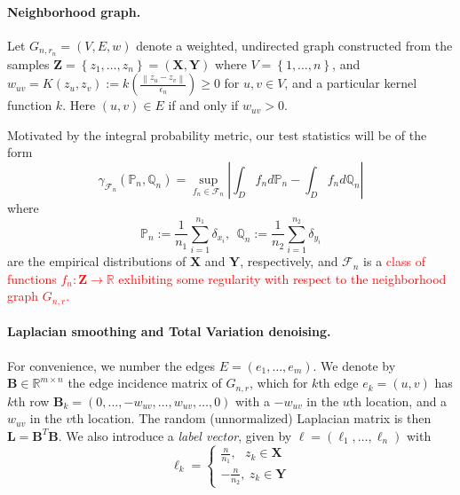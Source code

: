 \documentclass{article}
\newcommand{\Reals}{\mathbb{R}}
\newcommand{\norm}[1]{\left\lVert#1\right\rVert}
\newcommand{\abs}[1]{\left \lvert #1 \right \rvert}
\newcommand{\set}[1]{\left\{#1\right\}}
\newcommand{\F}{\mathcal{F}}
\newcommand{\Xbf}{\mathbf{X}}
\newcommand{\Ybf}{\mathbf{Y}}
\newcommand{\Zbf}{\mathbf{Z}}
\newcommand{\Lbf}{\mathbf{L}}
\newcommand{\Bbf}{\mathbf{B}}
\newcommand{\lbf}{\bm{\ell}}
\newcommand{\Pbb}{\mathbb{P}}
\newcommand{\Qbb}{\mathbb{Q}}
\newcommand{\1}{\mathbf{1}}
\theoremstyle{alden}
\theoremstyle{aldenthm}
\theoremstyle{remark}
\begin{document}
\paragraph{Neighborhood graph.}

Let $G_{n,r_n} = (V,E,w)$ denote a weighted, undirected graph constructed from the samples $\Zbf = \set{z_1, \ldots, z_n} = (\Xbf,\Ybf)$ where $V = \set{1, \ldots, n}$, and $w_{uv} = K(z_u, z_v):= k(\frac{\norm{z_u - z_v}}{\epsilon_n}) \geq 0$ for $u,v \in V$, and a particular kernel function $k$. Here $(u,v) \in E$ if and only if $w_{uv} > 0$.

Motivated by the integral probability metric, our test statistics will be of the form
\begin{equation*}
\gamma_{\F_n}(\Pbb_n,\Qbb_n) = \sup_{f_n \in \F_n}\abs{\int_{D} f_n d\Pbb_n - \int_{D} f_n d\Qbb_n}
\end{equation*}
where
\begin{equation*}
\Pbb_n := \frac{1}{n_1}\sum_{i = 1}^{n_1} \delta_{x_i}, ~~ \Qbb_n := \frac{1}{n_2}\sum_{i = 1}^{n_2} \delta_{y_i}
\end{equation*}
are the empirical distributions of $\Xbf$ and $\Ybf$, respectively, and $\F_n$ is a \textcolor{red}{class of functions $f_n: \Zbf \to \Reals$ exhibiting some regularity with respect to the neighborhood graph $G_{n,r}$.}

\paragraph{Laplacian smoothing and Total Variation denoising.}
 
For convenience, we number the edges $E  = (e_1, \ldots, e_m)$. We denote by $\Bbf \in \Reals^{m \times n}$ the edge incidence matrix of $G_{n,r}$, which for $k$th edge $e_k = (u,v)$ has $k$th row $\Bbf_{k} = (0,\ldots,-w_{uv},\ldots,w_{uv},\ldots,0)$ with a $-w_{uv}$ in the $u$th location, and a $w_{uv}$ in the $v$th location. The random (unnormalized) Laplacian matrix is then $\Lbf = \Bbf^T \Bbf$. We also introduce a \emph{label vector}, given by $\lbf = (\ell_1, \ldots, \ell_n)$ with
\begin{equation}
\label{eqn: label_vector}
\ell_k = 
\begin{cases}
\frac{n}{n_1},~~~ \text{$z_k \in \Xbf$} \\
-\frac{n}{n_2}, ~ \text{$z_k \in \Ybf$}
\end{cases}
\end{equation}
\end{document}
